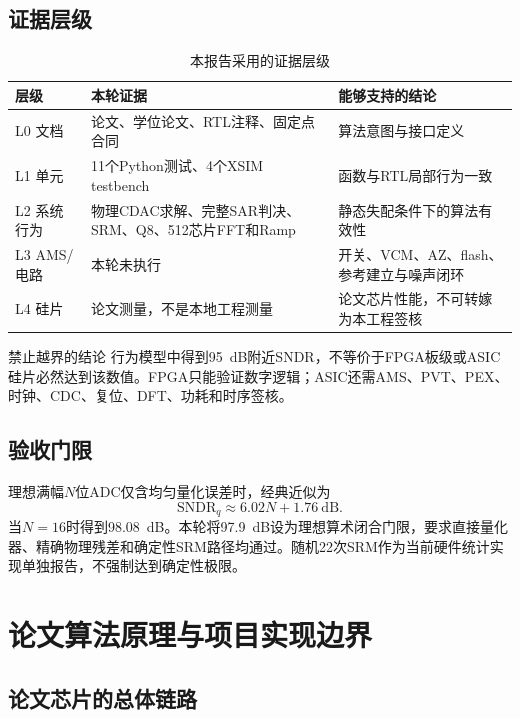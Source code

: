 \documentclass[11pt,a4paper,UTF8,fontset=none,openany]{ctexrep}
\numberwithin{equation}{chapter}
\numberwithin{figure}{chapter}
\numberwithin{table}{chapter}
\begin{document}
\section{证据层级}

\begin{table}[htbp]
\centering\small
\caption{本报告采用的证据层级}
\begin{tabularx}{\textwidth}{p{}X X}
\toprule
层级 & 本轮证据 & 能够支持的结论 \\
\midrule
L0 文档 & 论文、学位论文、RTL注释、固定点合同 & 算法意图与接口定义 \\
L1 单元 & 11个Python测试、4个XSIM testbench & 函数与RTL局部行为一致 \\
L2 系统行为 & 物理CDAC求解、完整SAR判决、SRM、Q8、512芯片FFT和Ramp & 静态失配条件下的算法有效性 \\
L3 AMS/电路 & 本轮未执行 & 开关、VCM、AZ、flash、参考建立与噪声闭环 \\
L4 硅片 & 论文测量，不是本地工程测量 & 论文芯片性能，不可转嫁为本工程签核 \\
\bottomrule
\end{tabularx}
\end{table}

\begin{riskbox}{禁止越界的结论}
行为模型中得到\SI{95}{dB}附近SNDR，不等价于FPGA板级或ASIC硅片必然达到该数值。FPGA只能验证数字逻辑；ASIC还需AMS、PVT、PEX、时钟、CDC、复位、DFT、功耗和时序签核。
\end{riskbox}

\section{验收门限}

理想满幅$N$位ADC仅含均匀量化误差时，经典近似为
\begin{equation}
\mathrm{SNDR}_{q}\approx 6.02N+1.76\ \mathrm{dB}.
\end{equation}
当$N=16$时得到\SI{98.08}{dB}。本轮将\SI{97.9}{dB}设为理想算术闭合门限，要求直接量化器、精确物理残差和确定性SRM路径均通过。随机22次SRM作为当前硬件统计实现单独报告，不强制达到确定性极限。

\chapter{论文算法原理与项目实现边界}

\section{论文芯片的总体链路}
\end{document}
